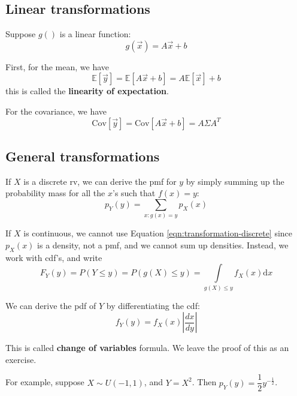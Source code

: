 \subsection{Linear transformations}
Suppose $g()$ is a linear function: 
\begin{equation}
g(\vec{x})=A\vec{x}+b
\end{equation}

First, for the mean, we have
\begin{equation}
\mathbb{E}[\vec{y}]=\mathbb{E}[A\vec{x}+b]=A\mathbb{E}[\vec{x}]+b
\end{equation}
this is called the \textbf{linearity of expectation}.

For the covariance, we have
\begin{equation}
\text{Cov}[\vec{y}]=\text{Cov}[A\vec{x}+b]=A\Sigma A^T
\end{equation}


\subsection{General transformations}
\label{sec:General-transformations}
If $X$ is a discrete rv, we can derive the pmf for $y$ by simply summing up the probability mass for all the $x$’s such that $f(x)=y$:
\begin{equation}\label{eqn:transformation-discrete}
p_Y(y)=\sum\limits_{x:g(x)=y}p_X(x)
\end{equation}

If $X$ is continuous, we cannot use Equation \ref{eqn:transformation-discrete} since $p_X(x)$ is a density, not a pmf, and we cannot sum up densities. Instead, we work with cdf’s, and write
\begin{equation}
F_Y(y)=P(Y \leq y)=P(g(X) \leq y)=\int\limits_{g(X) \leq y} f_X(x)\mathrm{d}x
\end{equation}

We can derive the pdf of $Y$ by differentiating the cdf:
\begin{equation}\label{eqn:General-transformations}
f_Y(y)=f_X(x)|\dfrac{dx}{dy}|
\end{equation}

This is called \textbf{change of variables} formula. We leave the proof of this as an exercise. 

For example, suppose $X \sim U(−1,1)$, and $Y=X^2$. Then $p_Y(y)=\dfrac{1}{2}y^{-\frac{1}{2}}$.


